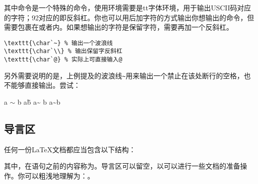 其中命令是一个特殊的命令，使用环境需要是tt字体环境，用于输出USCII码对应的字符；92对应的即反斜杠。你也可以用后加字符的方式输出你想输出的命令，但需要包裹在或者内。如果想输出的字符是保留字符，需要再加一个反斜杠。
\begin{verbatim}
\texttt{\char`~} % 输出一个波浪线
\texttt{\char`\\} % 输出保留字反斜杠
\texttt{\char`@} % 实际上可直接输入@
\end{verbatim}

另外需要说明的是，上例提及的波浪线{\texttt{\~}}用来输出一个禁止在该处断行的空格，也不能够直接输出。尝试：
\begin{codeshow}
a $\sim$ b
a\~ b
a\~{} b
a\textasciitilde b
\end{codeshow}

\subsection{导言区}
任何一份\LaTeX{}文档都应当包含以下结构：

其中，在语句之前的内容称为。导言区可以留空，以可以进行一些文档的准备操作。你可以粗浅地理解为：。\dpar

